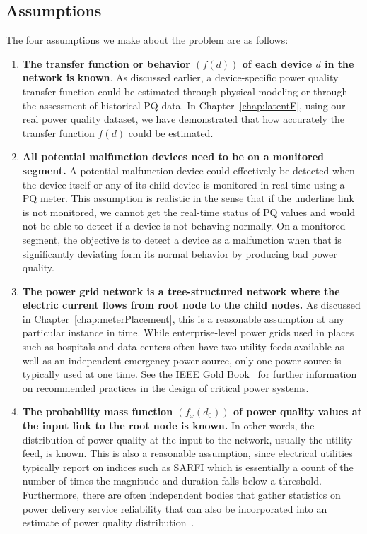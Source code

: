 \subsection{Assumptions}
The four assumptions we make about the problem are as follows:
\begin{enumerate}
\item \textbf{The transfer function or behavior $\left(f\left(d\right)\right)$ of each device $d$ in the network is known}. As discussed earlier, a device-specific power quality transfer function could be estimated through physical modeling or through the assessment of historical PQ data. In Chapter~\ref{chap:latentF}, using our real power quality dataset, we have demonstrated that how accurately the transfer function $f(d)$ could be estimated.

\item \textbf{All potential malfunction devices need to be on a monitored segment.} A potential malfunction device could effectively be detected when the device itself or any of its child device is monitored in real time using a PQ meter. This assumption is realistic in the sense that if the underline link is not monitored, we cannot get the real-time status of PQ values and would not be able to detect if a device is not behaving normally. On a monitored segment, the objective is to detect a device as a malfunction when that is significantly deviating form its normal behavior by producing bad power quality.

\item \textbf{The power grid network is a tree-structured network where the electric current flows from root node to the child nodes.} As discussed in Chapter~\ref{chap:meterPlacement}, this is a reasonable assumption at any particular instance in time. While enterprise-level power grids used in places such as hospitals and data centers often have two utility feeds available as well as an independent emergency power source, only one power source is typically used at one time. See the IEEE Gold Book~\cite{goldbook} for further information on recommended practices in the design of critical power systems.

\item \textbf{The probability mass function $(f_x\left(d_0\right))$ of power quality values at the input link to the root node is known.} In other words, the distribution of power quality at the input to the network, usually the utility feed, is known. This is also a reasonable assumption, since electrical utilities typically report on indices such as SARFI which is essentially a count of the number of times the magnitude and duration falls below a threshold. Furthermore, there are often independent bodies that gather statistics on power delivery service reliability that can also be incorporated into an estimate of power quality distribution~\cite{chowdhury2004reliability}.
\end{enumerate}


